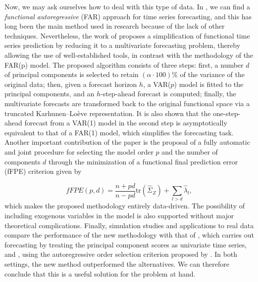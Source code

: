 \documentclass[
	12pt,				%
	oneside,			%
	a4paper,			%
	english,			%
	brazil				%
	]{abntex2ppgsi}
\begin{document}
Now, we may ask ourselves how to deal with this type of data. In , we can find a \textit{functional autoregressive} (FAR) approach for time series forecasting, and this has long been the main method used in research because of the lack of other techniques. Nevertheless, the work of  proposes a simplification of functional time series prediction by reducing it to a multivariate forecasting problem, thereby allowing the use of well-established tools, in contrast with the methodology of the FAR(p) model. The proposed algorithm consists of three steps: first, a number $d$ of principal components is selected to retain $(\alpha \cdot 100)\%$ of the variance of the original data; then, given a forecast horizon $h$, a VAR($p$) model is fitted to the principal components, and an $h$-step-ahead forecast is computed; finally, the multivariate forecasts are transformed back to the original functional space via a truncated Karhunen--Lo\`eve representation. It is also shown that the one-step-ahead forecast from a VAR(1) model in the second step is asymptotically equivalent to that of a FAR(1) model, which simplifies the forecasting task. Another important contribution of the paper is the proposal of a fully automatic and joint procedure for selecting the model order $p$ and the number of components $d$ through the minimization of a functional final prediction error (fFPE) criterion given by

\begin{equation}
 \textit{fFPE}(p,d)=\frac{n+pd}{n-pd}\mathrm{tr}(\hat{\Sigma}_{Z})+\sum_{l>d}\hat{\lambda}_{l},
\end{equation}
which makes the proposed methodology entirely data-driven. The possibility of including exogenous variables in the model is also supported without major theoretical complications. Finally, simulation studies and applications to real data compare the performance of the new methodology with that of , which carries out forecasting by treating the principal component scores as univariate time series, and , using the autoregressive order selection criterion proposed by . In both settings, the new method outperformed the alternatives. We can therefore conclude that this is a useful solution for the problem at hand.
\end{document}
